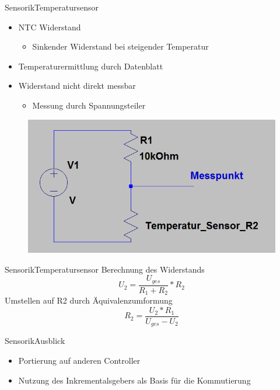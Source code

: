 \begin{frame}{Sensorik}{Temperatursensor}	
 \begin{itemize}
 \item NTC Widerstand
 \begin{itemize}
 \item Sinkender Widerstand bei steigender Temperatur
 \end{itemize}
 \item Temperaturermittlung durch Datenblatt
 \item Widerstand nicht direkt messbar
 \begin{itemize}
 \item Messung durch Spannungsteiler
 \end{itemize}
 \end{itemize}
 \begin{figure} [htbp]
 \centering
 \includegraphics[scale=0.3]{Sensor/temperature_circuit.PNG}
 \end{figure}
\end{frame}

\begin{frame}{Sensorik}{Temperatursensor}	
Berechnung des Widerstands
\begin{equation}
U_{2} = \frac{U_{ges}}{R_{1} + R_{2}} * R_{2}
\end{equation}
Umstellen auf R2 durch Äquivalenzumformung
\begin{equation}
R_{2} = \frac{U_{2} * R_{1}}{U_{ges} - U_{2}}
\end{equation} 
\end{frame}

\begin{frame}{Sensorik}{Ausblick}	
 \begin{itemize}
 \item Portierung auf anderen Controller
 \item Nutzung des Inkrementalsgebers als Basis für die Kommutierung
 \end{itemize}
\end{frame}